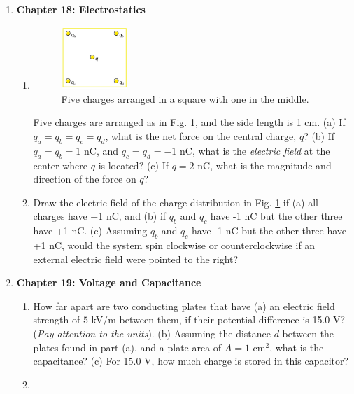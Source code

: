 \documentclass[10pt]{article}
\begin{document}
\begin{enumerate}
\item \textbf{Chapter 18: Electrostatics}
\begin{enumerate}
\item 
\begin{figure}
\centering
\includegraphics[width=0.25\textwidth]{charges.png}
\caption{\label{fig:charges} Five charges arranged in a square with one in the middle.}
\end{figure}
Five charges are arranged as in Fig. \ref{fig:charges}, and the side length is 1 cm. (a) If $q_a = q_b = q_c = q_d$, what is the net force on the central charge, $q$? (b) If $q_a = q_b = 1$ nC, and $q_c = q_d = -1$ nC, what is the \textit{electric field} at the center where $q$ is located?  (c) If $q=2$ nC, what is the magnitude and direction of the force on $q$? \\ \vspace{4cm}
\item Draw the electric field of the charge distribution in Fig. \ref{fig:charges} if (a) all charges have +1 nC, and (b) if $q_b$ and $q_c$ have -1 nC but the other three have +1 nC.  (c) Assuming $q_b$ and $q_c$ have -1 nC but the other three have +1 nC, would the system spin clockwise or counterclockwise if an external electric field were pointed to the right? \\ \vspace{5cm}
\end{enumerate}
\item \textbf{Chapter 19: Voltage and Capacitance}
\begin{enumerate}
\item  How far apart are two conducting plates that have (a) an electric field strength of $5$ kV/m between them, if their potential difference is 15.0 V? (\textit{Pay attention to the units}). (b) Assuming the distance $d$ between the plates found in part (a), and a plate area of $A = 1$ cm$^2$, what is the capacitance? (c) For 15.0 V, how much charge is stored in this capacitor? \\ \vspace{4cm}
\item
\begin{figure}

\end{figure}
\end{enumerate}
\end{enumerate}
\end{document}
